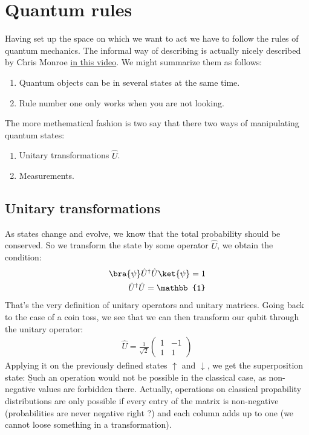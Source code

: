 \section{Quantum rules}
Having set up the space on which we want to act we have to follow the rules of quantum mechanics. The informal way of describing is actually nicely described by Chris Monroe \href{https://youtu.be/CC7nlBM2cSM}{in this video}. We might summarize them as follows:
\begin{enumerate}
\item Quantum objects can be in several states at the same time.
\item Rule number one only works when you are not looking.
\end{enumerate}

The more methematical fashion is two say that there two ways of manipulating quantum states:
\begin{enumerate}
\item Unitary transformations $\hat{U}$.
\item Measurements.
\end{enumerate}

\subsection{Unitary transformations}
As states change and evolve, we know that the total probability should be conserved. So we transform the state by some operator $\hat{U}$, we obtain the condition:
\begin{align}
\bra{\psi}\hat{U}^\dag\hat{U} \ket{\psi} = 1\\
\hat{U}^\dag\hat{U}  = \mathbb{1}
\end{align}
That's the very definition of unitary operators and unitary matrices.
Going back to the case of a coin toss, we see that we can then transform our qubit through the unitary operator:
\begin{align}
\hat{U}=\frac{1}{\sqrt{2}}\left(\begin{array}{cc}
1 & -1\\
1 & 1
\end{array}\right)
\end{align}
Applying it on the previously defined states $\uparrow$ and $\downarrow$, we get the superposition state:
\b
Such an operation would not be possible in the classical case, as non-negative values are forbidden there. Actually, operations on classical propability distributions are only possible if every entry of the matrix is non-negative (probabilities are never negative right ?) and each column adds up to one (we cannot loose something in a transformation).